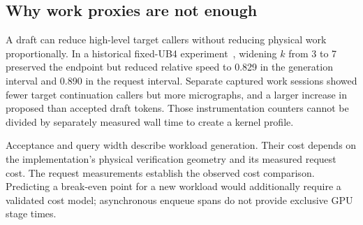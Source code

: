 \subsection{Why work proxies are not enough}
A draft can reduce high-level target callers without reducing physical work proportionally. In a historical fixed-UB4 experiment~\cite{history}, widening $k$ from 3 to 7 preserved the endpoint but reduced relative speed to 0.829 in the generation interval and 0.890 in the request interval. Separate captured work sessions showed fewer target continuation callers but more micrographs, and a larger increase in proposed than accepted draft tokens. Those instrumentation counters cannot be divided by separately measured wall time to create a kernel profile.

Acceptance and query width describe workload generation. Their cost depends on the implementation's physical verification geometry and its measured request cost. The request measurements establish the observed cost comparison. Predicting a break-even point for a new workload would additionally require a validated cost model; asynchronous enqueue spans do not provide exclusive GPU stage times.
